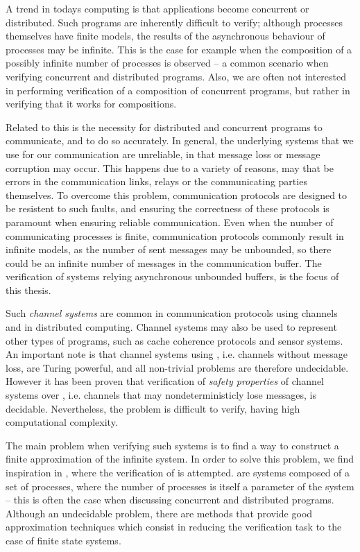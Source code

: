 A trend in todays computing is that applications become concurrent or distributed. Such programs are inherently difficult to verify; although processes themselves have finite models, the results of the asynchronous behaviour of processes may be infinite. This is the case for example when the composition of a possibly infinite number of processes is observed -- a common scenario when verifying concurrent and distributed programs. Also, we are often not interested in performing verification of a  composition of concurrent programs, but rather in verifying that it works for  compositions.

Related to this is the necessity for distributed and concurrent programs to communicate, and to do so accurately. In general, the underlying systems that we use for our communication are unreliable, in that message loss or message corruption may occur. This happens due to a variety of reasons, may that be errors in the communication links, relays or the communicating parties themselves. To overcome this problem, communication protocols are designed to be resistent to such faults, and ensuring the correctness of these protocols is paramount when ensuring reliable communication. Even when the number of communicating processes is finite, communication protocols commonly result in infinite models, as the number of sent messages may be unbounded, so there could be an infinite number of messages in the communication buffer. The verification of systems relying asynchronous unbounded buffers, is the focus of this thesis.

Such \emph{channel systems} are common in communication protocols using channels and in distributed computing\cite{fredlund2007mcerlang}. Channel systems may also be used to represent other types of programs, such as cache coherence protocols and sensor systems\cite{zuck2004}. An important note is that channel systems using , i.e. channels without message loss, are Turing powerful, and all non-trivial problems are therefore undecidable. However it has been proven that verification of \emph{safety properties} of channel systems over , i.e. channels that may nondeterministicly lose messages, is decidable\cite{287591}\cite{gordon}. Nevertheless, the problem is difficult to verify, having high computational complexity.

The main problem when verifying such systems is to find a way to construct a finite approximation of the infinite system. In order to solve this problem, we find inspiration in \cite{parosh}, where the verification of  is attempted.  are systems composed of a set of processes, where the number of processes is itself a parameter of the system -- this is often the case when discussing concurrent and distributed programs. Although an undecidable problem, there are methods that provide good approximation techniques which consist in reducing the verification task to the case of finite state systems.

